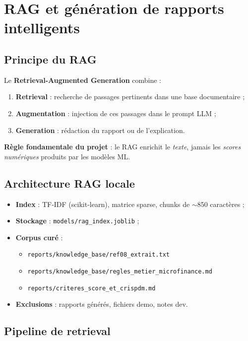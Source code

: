 \chapter{RAG et génération de rapports intelligents}
\label{ch:rag}

\section{Principe du RAG}

Le \textbf{Retrieval-Augmented Generation} combine :
\begin{enumerate}[leftmargin=*]
  \item \textbf{Retrieval} : recherche de passages pertinents dans une base documentaire ;
  \item \textbf{Augmentation} : injection de ces passages dans le prompt LLM ;
  \item \textbf{Generation} : rédaction du rapport ou de l'explication.
\end{enumerate}

\textbf{Règle fondamentale du projet} : le RAG enrichit le \textit{texte}, jamais les \textit{scores numériques} produits par les modèles ML.

\section{Architecture RAG locale}

\begin{itemize}[leftmargin=*]
  \item \textbf{Index} : TF-IDF (scikit-learn), matrice sparse, chunks de $\sim$850 caractères ;
  \item \textbf{Stockage} : \texttt{models/rag\_index.joblib} ;
  \item \textbf{Corpus curé} :
    \begin{itemize}
      \item \texttt{reports/knowledge\_base/ref08\_extrait.txt}
      \item \texttt{reports/knowledge\_base/regles\_metier\_microfinance.md}
      \item \texttt{reports/criteres\_score\_et\_crispdm.md}
    \end{itemize}
  \item \textbf{Exclusions} : rapports générés, fichiers demo, notes dev.
\end{itemize}

\section{Pipeline de retrieval}

